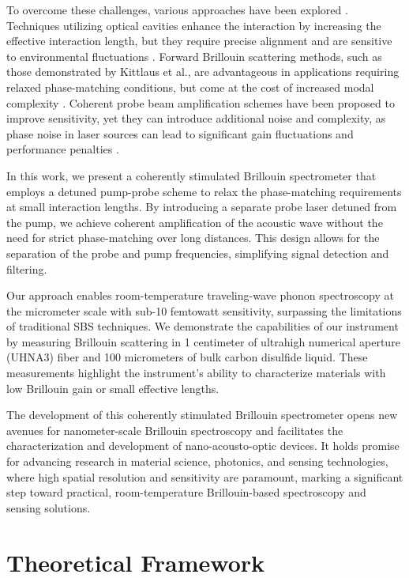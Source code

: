 \documentclass[%
  reprint,
  superscriptaddress,
  amsmath,amssymb,
  aps,
  prapplied,
]{revtex4-2}
\begin{document}
To overcome these challenges, various approaches have been explored \cite{shin2013tailorable, van2015interaction, kittlaus2016large}. Techniques utilizing optical cavities enhance the interaction by increasing the effective interaction length, but they require precise alignment and are sensitive to environmental fluctuations \cite{pant2011cavity}. Forward Brillouin scattering methods, such as those demonstrated by Kittlaus et al., are advantageous in applications requiring relaxed phase-matching conditions, but come at the cost of increased modal complexity \cite{kittlaus2017chip}. Coherent probe beam amplification schemes have been proposed to improve sensitivity, yet they can introduce additional noise and complexity, as phase noise in laser sources can lead to significant gain fluctuations and performance penalties \cite{shlomovits2015effect}.

In this work, we present a coherently stimulated Brillouin spectrometer that employs a detuned pump-probe scheme to relax the phase-matching requirements at small interaction lengths. By introducing a separate probe laser detuned from the pump, we achieve coherent amplification of the acoustic wave without the need for strict phase-matching over long distances. This design allows for the separation of the probe and pump frequencies, simplifying signal detection and filtering.

Our approach enables room-temperature traveling-wave phonon spectroscopy at the micrometer scale with sub-10 femtowatt sensitivity, surpassing the limitations of traditional SBS techniques. We demonstrate the capabilities of our instrument by measuring Brillouin scattering in 1 centimeter of ultrahigh numerical aperture (UHNA3) fiber and 100 micrometers of bulk carbon disulfide liquid. These measurements highlight the instrument's ability to characterize materials with low Brillouin gain or small effective lengths.

The development of this coherently stimulated Brillouin spectrometer opens new avenues for nanometer-scale Brillouin spectroscopy and facilitates the characterization and development of nano-acousto-optic devices. It holds promise for advancing research in material science, photonics, and sensing technologies, where high spatial resolution and sensitivity are paramount, marking a significant step toward practical, room-temperature Brillouin-based spectroscopy and sensing solutions.

\section{Theoretical Framework}
\label{Theoretical Framework}
\end{document}
